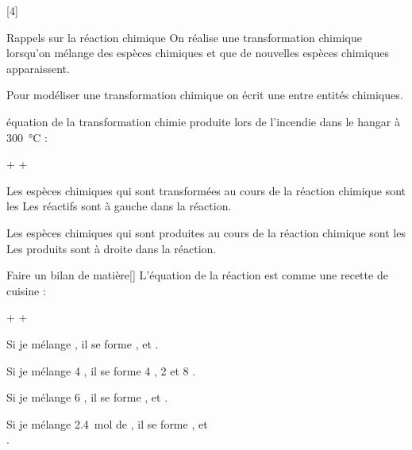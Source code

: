 [4]



\begin{doc}{Rappels sur la réaction chimique}
  On réalise une transformation chimique lorsqu’on mélange des espèces chimiques et que de nouvelles espèces chimiques apparaissent.
  \begin{importants}
    Pour modéliser une transformation chimique on écrit une  entre entités chimiques.
  \end{importants}
  équation de la transformation chimie produite lors de l’incendie dans le hangar à \qty{300}{\degreeCelsius} :
  \begin{center}
    \sol \reaction
    \diazote\gaz + \dioxygene\gaz + \eau\liq
  \end{center}

  \begin{multicols}{2}
    \begin{importants}
      Les espèces chimiques qui sont transformées au cours de la réaction chimique sont les 
      Les réactifs sont à gauche dans la réaction.
    \end{importants}
    \begin{importants}
      Les espèces chimiques qui sont produites au cours de la réaction chimique sont les 
      Les produits sont à droite dans la réaction.
    \end{importants}
  \end{multicols}
\end{doc}

\begin{doc}{Faire un bilan de matière}[\label{doc:bilan_matiere}]
  L'équation de la réaction est comme une recette de cuisine :
  \begin{center}
    \sol \reaction
    \diazote\gaz + \dioxygene\gaz + \eau\liq
  \end{center}
  Si je mélange  , il se forme  \diazote,
   \dioxygene\; et  \eau.
  
  Si je mélange 4 , il se forme 4 \diazote, 2 \dioxygene\; et 8 \eau.
  
  Si je mélange 6 , il se forme  \diazote,  \dioxygene\; et  \eau.
  
  Si je mélange \qty{2,4}{\mole} de , il se forme
   \diazote,
   \dioxygene\; et \\
   \eau.
\end{doc}

